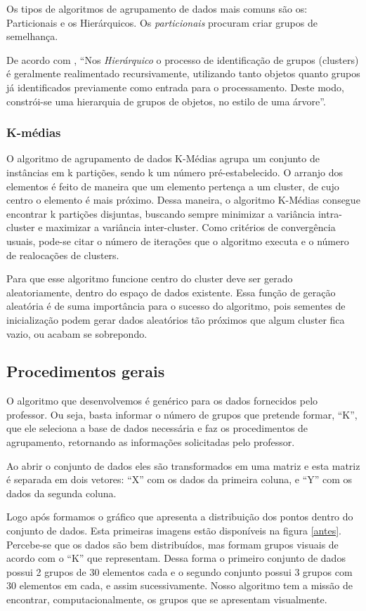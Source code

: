 \documentclass[12pt, a4paper]{article}
\begin{document}
Os tipos de algoritmos de agrupamento de dados mais comuns são os: Particionais e os Hierárquicos. Os \emph{particionais} procuram criar grupos de semelhança.

De acordo com \citep{hierarquico}, ``Nos \emph{Hierárquico} o processo de identificação de grupos (clusters) é geralmente realimentado recursivamente, utilizando tanto objetos quanto grupos já identificados previamente como entrada para o processamento. Deste modo, constrói-se uma hierarquia de grupos de objetos, no estilo de uma árvore''.

\subsubsection{K-médias}
O algoritmo de agrupamento de dados K-Médias agrupa um conjunto de instâncias
em k partições, sendo k um número pré-estabelecido. O arranjo dos elementos é feito de maneira
que um elemento pertença a um cluster, de cujo centro o elemento é mais próximo.
Dessa maneira, o algoritmo K-Médias consegue encontrar k partições disjuntas, buscando sempre
minimizar a variância intra-cluster e maximizar a variância inter-cluster. Como critérios de
convergência usuais, pode-se citar o número de iterações que o algoritmo executa e o número de
realocações de clusters.

Para que esse algoritmo funcione centro do cluster deve ser gerado aleatoriamente, dentro do espaço de dados existente. Essa função de geração aleatória é de suma importância para o sucesso do algoritmo, pois sementes de inicialização podem gerar dados aleatórios tão próximos que algum cluster fica vazio, ou acabam se sobrepondo.

\subsection{Procedimentos gerais}
O algoritmo que desenvolvemos é genérico para os dados fornecidos pelo professor. Ou seja, basta informar o número de grupos que pretende formar, ``K'', que ele seleciona a base de dados necessária e faz os procedimentos de agrupamento, retornando as informações solicitadas pelo professor.

Ao abrir o conjunto de dados eles são transformados em uma matriz e esta matriz é separada em dois vetores: ``X'' com os dados da primeira coluna, e ``Y'' com os dados da segunda coluna.

Logo após formamos o gráfico que apresenta a distribuição dos pontos dentro do conjunto de dados. Esta primeiras imagens estão disponíveis na figura \ref{antes}. Percebe-se que os dados são bem distribuídos, mas formam grupos visuais de acordo com o ``K'' que representam. Dessa forma o primeiro conjunto de dados possui 2 grupos de 30 elementos cada e o segundo conjunto possui 3 grupos com 30 elementos em cada, e assim sucessivamente. Nosso algoritmo tem a missão de encontrar, computacionalmente, os grupos que se apresentam visualmente.
\end{document}
